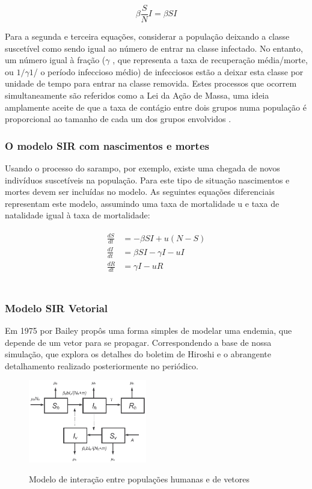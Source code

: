 \documentclass[conference]{IEEEtran}
\begin{document}
	\begin{equation}
	\beta \frac{S}{N}I = \beta SI
	\end{equation}
	
	  Para a segunda e terceira equações, considerar a população deixando a classe suscetível como sendo igual ao número de entrar na classe infectado. 
	No entanto, um número igual à fração ($\gamma$ , que representa a taxa de recuperação média/morte, ou $1/\gamma1$/ o período infeccioso médio) de infecciosos estão a deixar esta classe por unidade de tempo para entrar na classe removida. Estes processos que ocorrem simultaneamente são referidos como a Lei da Ação de Massa, uma ideia amplamente aceite de que a taxa de contágio entre dois grupos numa população é proporcional ao tamanho de cada um dos grupos envolvidos \cite{daley2001epidemic}.

\subsubsection{O modelo SIR com nascimentos e mortes}
Usando o processo do sarampo, por exemplo, existe uma chegada de novos indivíduos suscetíveis na população. Para este tipo de situação nascimentos e mortes devem ser incluídas no modelo. As seguintes equações diferenciais representam este modelo, assumindo uma taxa de mortalidade u e taxa de natalidade igual à taxa de mortalidade:

\begin{align}
\begin{split}
    \frac{dS}{dt} &= -\beta SI + u(N-S)\\
    \frac{dI}{dt} &= \beta SI- \gamma I - uI\\   
    \frac{dR}{dt} &= \gamma I - uR
\end{split}
\end{align}\\

\subsubsection{Modelo SIR Vetorial}
Em 1975 por Bailey\cite{bailey1975mathematical} propôs uma forma simples de modelar uma endemia, que depende de um vetor para se propagar. Correspondendo a base de nossa simulação, que explora os detalhes do boletim de Hiroshi \cite{nishiura2006mathematical} e o abrangente detalhamento realizado posteriormente  no periódico\cite{10.1371/journal.pone.0049085}.

\begin{figure}[!ht]
  \caption{Modelo de interação entre populações humanas e de vetores}
  \includegraphics[width=0.46\textwidth]{modelosirvetorial.png}
    \label{fig:modelo}
\end{figure}
\end{document}
